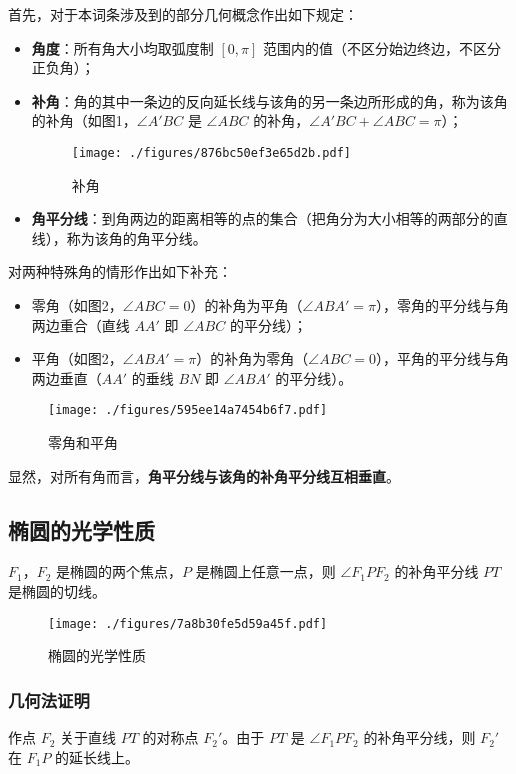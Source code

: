 

首先，对于本词条涉及到的部分几何概念作出如下规定：
\begin{itemize}
\item \textbf{角度}：所有角大小均取弧度制 $[0,\pi]$ 范围内的值（不区分始边终边，不区分正负角）；
\item \textbf{补角}：角的其中一条边的反向延长线与该角的另一条边所形成的角，称为该角的补角（如图1，$\angle A'BC$ 是 $\angle ABC$ 的补角，$\angle A'BC + \angle ABC = \pi$）；
\begin{figure}[ht]
\centering
\texttt{[image: ./figures/876bc50ef3e65d2b.pdf]}
\caption{补角} \label{fig_ConOpt_1}
\end{figure}
\item \textbf{角平分线}：到角两边的距离相等的点的集合（把角分为大小相等的两部分的直线），称为该角的角平分线。
\end{itemize}
对两种特殊角的情形作出如下补充：
\begin{itemize}
\item 零角（如图2，$\angle ABC = 0$）的补角为平角（$\angle ABA' = \pi$），零角的平分线与角两边重合（直线 $AA'$ 即 $\angle ABC$ 的平分线）；
\item 平角（如图2，$\angle ABA' = \pi$）的补角为零角（$\angle ABC = 0$），平角的平分线与角两边垂直（$AA'$ 的垂线 $BN$ 即 $\angle ABA'$ 的平分线）。
\end{itemize}
\begin{figure}[ht]
\centering
\texttt{[image: ./figures/595ee14a7454b6f7.pdf]}
\caption{零角和平角} \label{fig_ConOpt_2}
\end{figure}
显然，对所有角而言，\textbf{角平分线与该角的补角平分线互相垂直}。

\subsection{椭圆的光学性质}
$F_1$，$F_2$ 是椭圆的两个焦点，$ P $ 是椭圆上任意一点，则 $\angle F_1PF_2 $ 的补角平分线 $ PT $ 是椭圆的切线。
\begin{figure}[ht]
\centering
\texttt{[image: ./figures/7a8b30fe5d59a45f.pdf]}
\caption{椭圆的光学性质} \label{fig_ConOpt_3}
\end{figure}
\subsubsection{几何法证明}
作点 $F_2$ 关于直线 $PT$ 的对称点 $F_2'$。由于 $PT$ 是 $\angle F_1PF_2 $ 的补角平分线，则 $F_2'$ 在 $F_1P$ 的延长线上。

